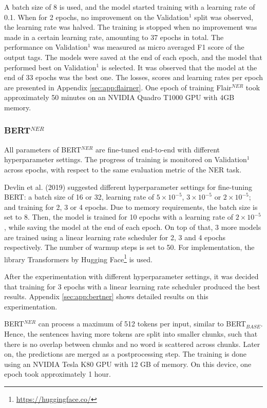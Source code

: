 \documentclass{report}
\theoremstyle{definition}
\theoremstyle{remark}
\begin{document}
A batch size of 8 is used, and the model started training with a learning rate of 0.1. When for 2 epochs, no improvement on the Validation$^1$ split was observed, the learning rate was halved. The training is stopped when no improvement was made in a certain learning rate, amounting to 37 epochs in total. The performance on Validation$^1$ was measured as micro averaged F1 score of the output tags. The models were saved at the end of each epoch, and the model that performed best on Validation$^1$ is selected. It was observed that the model at the end of 33 epochs was the best one. The losses, scores and learning rates per epoch are presented in Appendix \ref{sec:app:flairner}. One epoch of training Flair$^{NER}$ took approximately 50 minutes on an NVIDIA Quadro T1000 GPU with 4GB memory. 
\subsubsection{BERT$^{NER}$}
All parameters of BERT$^{NER}$ are fine-tuned end-to-end with different hyperparameter settings. The progress of training is monitored on Validation$^1$ across epochs, with respect to the same evaluation metric of the NER task.

Devlin et al. (2019) \cite{BERT} suggested different hyperparameter settings for fine-tuning BERT: a batch size of 16 or 32, learning rate of $5\times10^{-5}$, $3\times10^{-5}$ or $2\times10^{-5}$; and training for 2, 3 or 4 epochs. Due to memory requirements, the batch size is set to 8. Then, the model is trained for 10 epochs with a learning rate of $2\times10^{-5}$, while saving the model at the end of each epoch. On top of that, 3 more models are trained using a linear learning rate scheduler for 2, 3 and 4 epochs respectively. The number of warmup steps is set to 50. For implementation, the library Transformers \cite{huggingface} by Hugging Face\footnote{\url{https://huggingface.co/}} is used.

After the experimentation with different hyperparameter settings, it was decided that training for 3 epochs with a linear learning rate scheduler produced the best results. Appendix \ref{sec:app:bertner} shows detailed results on this experimentation.

BERT$^{NER}$ can process a maximum of 512 tokens per input, similar to BERT$_{BASE}$. Hence, the sentences having more tokens are split into smaller chunks, such that there is no overlap between chunks and no word is scattered across chunks. Later on, the predictions are merged as a postprocessing step. The training is done using an NVIDIA Tesla K80 GPU with 12 GB of memory. On this device, one epoch took approximately 1 hour. 
\end{document}
